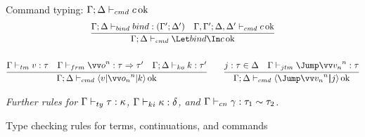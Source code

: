 \documentclass{article}
\begin{document}
\begin{figure}
Command typing: $\Gamma; \Delta \vdash_{cmd} c \operatorname{ok}$
\begin{gather*}
  \infer
  {\typecmd{\Gamma}{\Delta}{\Let \abind \In \cmd}}
  {
    \typebind{\Gamma}{\Delta}{\abind}{\Gamma'}{\Delta'}
    &
    \typecmd{\Gamma,\Gamma'}{\Delta,\Delta'}{\cmd}
  }
  \\\\
  \infer
  {\typecmd{\Gamma}{\Delta}{\braket{\tm | \vect[n]{\frm_n} | \ko}}}
  {
    \typetm{\Gamma}{\tm}{\ty}
    &
    \typefrm{\Gamma}{\vect[n]{\frm}}{\ty}{\ty'}
    &
    \typeko{\Gamma}{\Delta}{\ko}{\ty'}
  }
  \qquad
  \infer
  {\typecmd{\Gamma}{\Delta}{\jump{\vect[n]{\tm_n}}{j}}}
  {
    j:\ty \in \Delta
    &
    \typejmptm{\Gamma}{\vect[n]{\tm_n}}{\ty}
  }
\end{gather*}

\emph{Further rules for $\Gamma \vdash_{ty} \tau : \kappa$,
  $\Gamma \vdash_{ki} \kappa : \delta$, and
  $\Gamma \vdash_{cn} \gamma : \tau_1 \sim \tau_2$.}
\caption{Type checking rules for terms, continuations, and commands}
\label{fig:typing-rules}
\end{figure}
\end{document}
